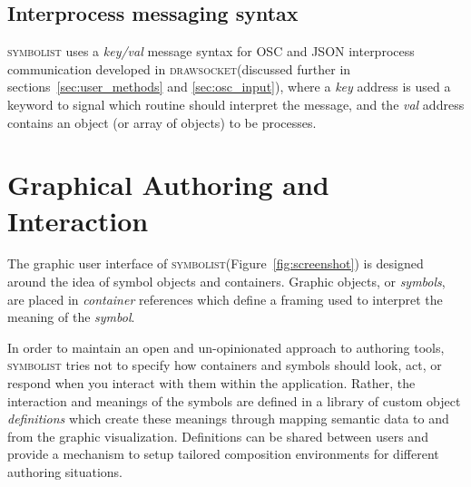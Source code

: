 \documentclass{article}
\def\symbolist{\textsc{symbolist}\xspace}
\def\drawsocket{\textsc{drawsocket}\xspace}
\def\uicontroller{\textit{ui\_controller}\xspace}
\def\iocontroller{\textit{io\_controller}\xspace}
\begin{document}

\subsection*{Interprocess messaging syntax} 
\symbolist uses a \textit{key/val} message syntax for OSC and JSON interprocess communication developed in \drawsocket (discussed further in sections~\ref{sec:user_methods} and \ref{sec:osc_input}), where a \textit{key} address is used a keyword to signal which routine should interpret the message, and the \textit{val} address contains an object (or array of objects) to be processes.


%
%

\section{Graphical Authoring and Interaction}\label{sec:editor} %


The graphic user interface of \symbolist (Figure~\ref{fig:screenshot}) is designed around the idea of symbol objects and containers. Graphic objects, or \textit{symbols}, are placed in \textit{container} references which define a framing used to interpret the meaning of the \textit{symbol}.

In order to maintain an open and un-opinionated approach to authoring tools, \symbolist tries not to specify how containers and symbols should look, act, or respond when you interact with them within the application. 
Rather, the interaction and meanings of the symbols are defined in a library of custom object \textit{definitions} which create these meanings through mapping semantic data to and from the graphic visualization. 
Definitions can be shared between users and provide a mechanism to setup tailored composition environments for different authoring situations.
\end{document}

